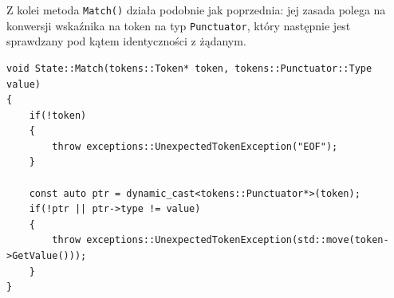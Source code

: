 Z kolei metoda \texttt{Match()} działa podobnie jak poprzednia: jej zasada polega na konwersji wskaźnika na token na typ \texttt{Punctuator}, który następnie jest sprawdzany pod kątem identyczności z żądanym.

\begin{lstlisting}[label=list:match,caption=Metoda State::Match(),basicstyle=\footnotesize\ttfamily]
void State::Match(tokens::Token* token, tokens::Punctuator::Type value)
{
    if(!token)
    {
        throw exceptions::UnexpectedTokenException("EOF");
    }
    
    const auto ptr = dynamic_cast<tokens::Punctuator*>(token);
    if(!ptr || ptr->type != value)
    {
        throw exceptions::UnexpectedTokenException(std::move(token->GetValue()));
    }
}
\end{lstlisting}